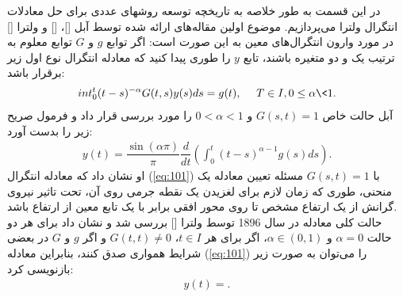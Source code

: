 در این قسمت به طور خلاصه به تاریخچه توسعه روشهای عددی برای حل معادلات انتگرال ولترا می‌پردازیم. موضوع اولین مقاله‌های ارائه شده توسط آبل []، [] و ولترا [] در مورد وارون انتگرال‌های معین به این صورت است: اگر توابع $g$ و $G$ توابع معلوم به ترتیب یک و دو متغیره باشند، تابع $y$ را طوری پیدا کنید که معادله انتگرال نوع اول زیر برقرار باشد:
\begin{align}\label{eq:101}
int_0^t(t-s)^{-\alpha}G(t,s)y(s)ds=g(t),~~~~T\in I, 0\leq\alpha\<1.
\end{align}
آبل حالت خاص $G(s,t)=1$ و $0<\alpha<1$ را مورد بررسی قرار داد و فرمول صریح زیر را بدست آورد:
\begin{align}\label{eq:102}
y(t)=\dfrac{\sin(\alpha\pi)}{\pi}\dfrac{d}{dt}(\int_0^t(t-s)^{\alpha-1}g(s)ds).
\end{align}
او نشان داد که معادله انتگرال (\ref{eq:101}) با $G(s,t)=1$ مسئله تعیین معادله یک منحنی، طوری که زمان لازم برای لغزیدن یک نقطه جرمی روی آن، تحت تاثیر نیروی گرانش از یک ارتفاع مشخص تا روی محور افقی برابر با یک تابع معین از ارتفاع باشد.\\
حالت کلی معادله در سال 1896 توسط ولترا [] بررسی شد و نشان داد برای هر دو حالت $\alpha=0$ و $\alpha\in(0,1)$، اگر برای هر $t\in I$، $G(t,t)\neq0$ و اگر $g$ و $G$ در بعضی شرایط همواری صدق کنند، بنابراین معادله (\ref{eq:101}) را می‌توان به صورت زیر بازنویسی کرد:
\begin{align}\label{eq:103}
y(t)=.
\end{align}